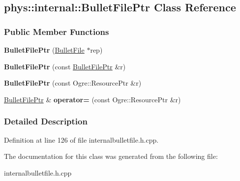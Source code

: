 \hypertarget{classphys_1_1internal_1_1BulletFilePtr}{
\subsection{phys::internal::BulletFilePtr Class Reference}
\label{classphys_1_1internal_1_1BulletFilePtr}
}
\subsubsection*{Public Member Functions}
\begin{DoxyCompactItemize}
\item 
\hypertarget{classphys_1_1internal_1_1BulletFilePtr_a63b21053a6a9da4dfe722dee7ed3c4cf}{
{\bfseries BulletFilePtr} (\hyperlink{classphys_1_1internal_1_1BulletFile}{BulletFile} $\ast$rep)}
\label{classphys_1_1internal_1_1BulletFilePtr_a63b21053a6a9da4dfe722dee7ed3c4cf}

\item 
\hypertarget{classphys_1_1internal_1_1BulletFilePtr_ac5c6ddc636686aeb9ed294fa7782c32c}{
{\bfseries BulletFilePtr} (const \hyperlink{classphys_1_1internal_1_1BulletFilePtr}{BulletFilePtr} \&r)}
\label{classphys_1_1internal_1_1BulletFilePtr_ac5c6ddc636686aeb9ed294fa7782c32c}

\item 
\hypertarget{classphys_1_1internal_1_1BulletFilePtr_aa8c26e0d2ae6d61e61c626cd0e468e14}{
{\bfseries BulletFilePtr} (const Ogre::ResourcePtr \&r)}
\label{classphys_1_1internal_1_1BulletFilePtr_aa8c26e0d2ae6d61e61c626cd0e468e14}

\item 
\hypertarget{classphys_1_1internal_1_1BulletFilePtr_a5d283546eaf1a58668389fe5e913166a}{
\hyperlink{classphys_1_1internal_1_1BulletFilePtr}{BulletFilePtr} \& {\bfseries operator=} (const Ogre::ResourcePtr \&r)}
\label{classphys_1_1internal_1_1BulletFilePtr_a5d283546eaf1a58668389fe5e913166a}

\end{DoxyCompactItemize}


\subsubsection{Detailed Description}


Definition at line 126 of file internalbulletfile.h.cpp.



The documentation for this class was generated from the following file:\begin{DoxyCompactItemize}
\item 
internalbulletfile.h.cpp\end{DoxyCompactItemize}

